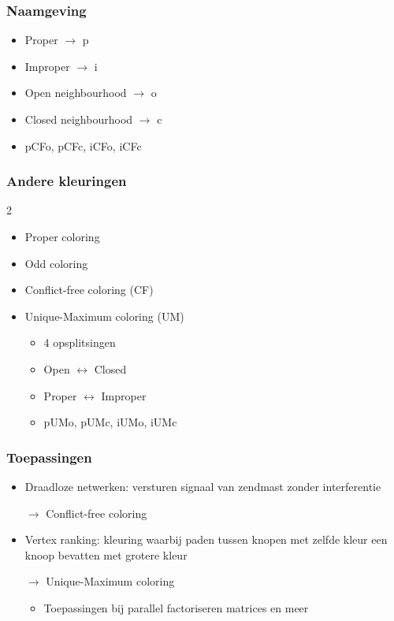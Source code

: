 \documentclass
[kulak] %
{kulakbeamer}
\begin{document}
	\begin{frame}
		\frametitle{Naamgeving}
		
		\begin{itemize}
			\item Proper $\rightarrow$ p
			\item Improper $\rightarrow$ i
			\item Open neighbourhood $\rightarrow$ o
			\item Closed neighbourhood $\rightarrow$ c
			\item pCFo, pCFc, iCFo, iCFc
		\end{itemize}
	\end{frame}
	
	\begin{frame}
		\frametitle{Andere kleuringen}
		
		
		\begin{multicols}{2}
			
			\begin{itemize}
				\item Proper coloring
				\item Odd coloring
				\item Conflict-free coloring (CF)
				\item Unique-Maximum coloring (UM)
				\pause
				\begin{itemize}
					\item 4 opsplitsingen
					\item Open $\longleftrightarrow$ Closed
					\item Proper $\longleftrightarrow$ Improper		
					\item pUMo, pUMc, iUMo, iUMc
				\end{itemize}
			\end{itemize}
			
			\vspace*{\fill}\null
			
			\begin{center}
				\scalebox{.75}{}
			\end{center}
			

			
		\end{multicols}
		
		
	\end{frame}
	
	\begin{frame}
		\frametitle{Toepassingen}
		\begin{itemize}
			\item Draadloze netwerken: versturen signaal van zendmast zonder interferentie 
			
			$\rightarrow$ Conflict-free coloring
			\item Vertex ranking: kleuring waarbij paden tussen knopen met zelfde kleur een knoop bevatten met grotere kleur
			
			$\rightarrow$ Unique-Maximum coloring
			\begin{itemize}
				\item Toepassingen bij parallel factoriseren matrices en meer
			\end{itemize}
		\end{itemize}
	\end{frame}
	
\end{document}
